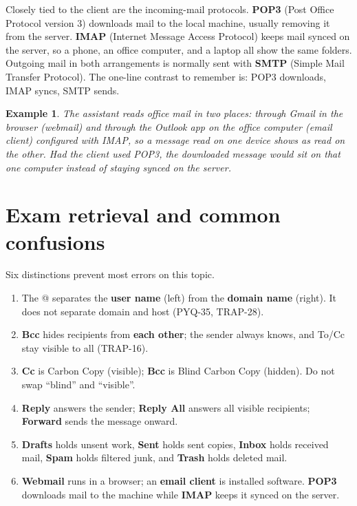 \documentclass[11pt]{article}
\newtheorem{example}{Example}[section]
\begin{document}
Closely tied to the client are the incoming-mail protocols. \textbf{POP3}
(Post Office Protocol version 3) downloads mail to the local machine, usually
removing it from the server. \textbf{IMAP} (Internet Message Access Protocol)
keeps mail synced on the server, so a phone, an office computer, and a laptop
all show the same folders. Outgoing mail in both arrangements is normally
sent with \textbf{SMTP} (Simple Mail Transfer Protocol). The one-line
contrast to remember is: POP3 downloads, IMAP syncs, SMTP sends.

\begin{example}
The assistant reads office mail in two places: through Gmail in the browser
(webmail) and through the Outlook app on the office computer (email client)
configured with IMAP, so a message read on one device shows as read on the
other. Had the client used POP3, the downloaded message would sit on that one
computer instead of staying synced on the server.
\end{example}

\section{Exam retrieval and common confusions}
Six distinctions prevent most errors on this topic.
\begin{enumerate}
  \item The @ separates the \textbf{user name} (left) from the \textbf{domain
    name} (right). It does not separate domain and host (PYQ-35, TRAP-28).
  \item \textbf{Bcc} hides recipients from \textbf{each other}; the sender
    always knows, and To/Cc stay visible to all (TRAP-16).
  \item \textbf{Cc} is Carbon Copy (visible); \textbf{Bcc} is Blind Carbon Copy
    (hidden). Do not swap ``blind'' and ``visible''.
  \item \textbf{Reply} answers the sender; \textbf{Reply All} answers all
    visible recipients; \textbf{Forward} sends the message onward.
  \item \textbf{Drafts} holds unsent work, \textbf{Sent} holds sent copies,
    \textbf{Inbox} holds received mail, \textbf{Spam} holds filtered junk,
    and \textbf{Trash} holds deleted mail.
  \item \textbf{Webmail} runs in a browser; an \textbf{email client} is
    installed software. \textbf{POP3} downloads mail to the machine while
    \textbf{IMAP} keeps it synced on the server.
\end{enumerate}
\end{document}
